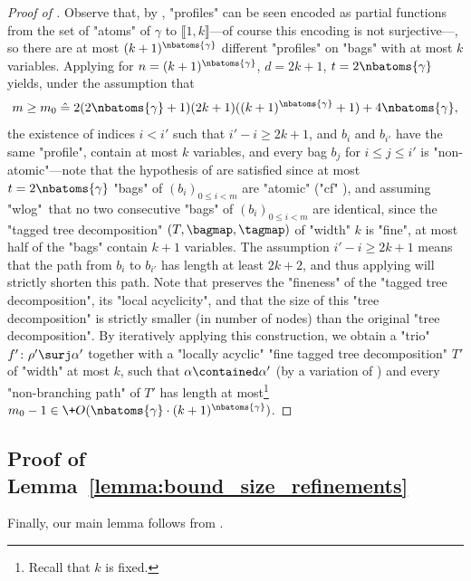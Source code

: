 \begin{proof}[Proof of ]
    Observe that, by ,
	"profiles" can be seen encoded as partial functions from the set of "atoms" of $\gamma$ to $\lBrack 1,k\rBrack$---of course this encoding is not surjective---, so
	there are at most $(k+1)^{\nbatoms{\gamma}}$ different "profiles" on "bags" with at most $k$ variables.
    Applying  for $n = (k+1)^{\nbatoms{\gamma}}$, $d = 2k+1$, $t = 2\nbatoms{\gamma}$ yields, under the assumption that
    \[
        m \geq m_0 \defeq 2(2\nbatoms{\gamma}+1)(2k+1)((k+1)^{\nbatoms{\gamma}}+1)
		+ 4\nbatoms{\gamma},
    \]
    the existence of indices $i < i'$ such that $i' - i \geq 2k+1$,
    and $b_i$ and $b_{i'}$ have the same "profile", contain at most $k$ variables,
    and every bag $b_j$ for $i \leq j \leq i'$ is "non-atomic"---note that the hypothesis
    of  are satisfied since at most $t = 2\nbatoms{\gamma}$
    "bags" of $(b_i)_{0 \leq i < m}$ are "atomic" ("cf" ), and assuming "wlog"~that
    no two consecutive "bags" of $(b_i)_{0 \leq i < m}$ are identical, since the "tagged tree decomposition" $(T, \bagmap, \tagmap)$ of "width" $k$ is "fine", at most half of the 
    "bags" contain $k+1$ variables.
    The assumption $i' - i \geq 2k+1$ means that the path from $b_i$ to $b_{i'}$ has
    length at least $2k+2$, and thus applying  will
    strictly shorten this path.
    Note that  preserves the "fineness" of the "tagged 
    tree decomposition", its "local acyclicity", and that the size of
    this "tree decomposition" is strictly smaller (in number of nodes) than
    the original "tree decomposition". By iteratively applying this construction,
    we obtain a "trio" $\fun'\colon \rho' \surj \alpha'$ together with a "locally acyclic"
    "fine tagged tree decomposition" $T'$
    of "width" at most $k$, such that $\alpha \contained \alpha'$ (by a variation of
	)
    and every "non-branching path" of $T'$ has length at most\footnote{Recall that $k$
	is fixed.} 
    $m_0 - 1 \in 
    \+O(\nbatoms{\gamma}\cdot (k+1)^{\nbatoms{\gamma}})$.
\end{proof}

\subsection{Proof of Lemma~\ref{lemma:bound_size_refinements}}
\label{sec:proof-bound-size-refinements}

Finally, our main lemma follows from
.

